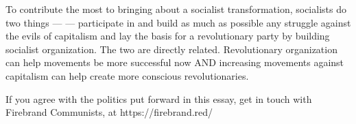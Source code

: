To contribute the most to bringing about a socialist transformation, socialists do two things — — participate in and build as much as possible any struggle against the evils of capitalism and lay the basis for a revolutionary party by building socialist organization. The two are directly related. Revolutionary organization can help movements be more successful now AND increasing movements against capitalism can help create more conscious revolutionaries.

If you agree with the politics put forward in this essay, get in touch with Firebrand Communists, at https://firebrand.red/
